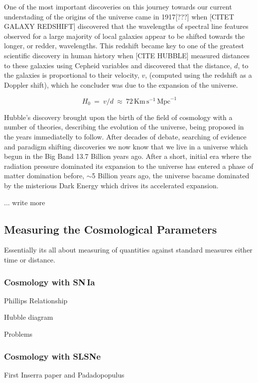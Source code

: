 One of the most important discoveries on this journey towards our current understading of the origins of the universe came in 1917[???] when [CITET GALAXY REDSHIFT] discovered that the wavelengths of spectral line features observed for a large majority of local galaxies appear to be shifted towards the longer, or redder, wavelengths. This redshift became key to one of the greatest scientific discovery in human history when [CITE HUBBLE] measured distances to these galaxies using Cepheid variables and discovered that the distance, $d$, to the galaxies is proportional to their velocity, $v$, (computed using the redshift as a Doppler shift), which he concluder was due to the expansion of the universe.

\begin{equation}
H_0~=~v/d~\approx~72\,\mathrm{Km}\,\mathrm{s}^{-1}\,\mathrm{Mpc}^{-1}
\end{equation}

Hubble's discovery brought upon the birth of the field of cosmology with a number of theories, describing the evolution of the universe, being proposed in the years immediatelly to follow. After decades of debate, searching of evidence and paradigm shifting discoveries we now know that we live in a universe which begun in the Big Band 13.7 Billion years ago. After a short, initial era where the radiation pressure dominated its expansion to the universe has entered a phase of matter domination before, $\sim$5 Billion years ago, the universe bacame dominated by the misterious Dark Energy which drives its accelerated expansion.

... write more

\subsection{Measuring the Cosmological Parameters}
Essentially its all about measuring of quantities against standard measures either time or distance.

\subsubsection{Cosmology with SN\,Ia}
Phillips Relationship

Hubble diagram

Problems

\subsubsection{Cosmology with SLSNe}
First Inserra paper and Padadopopulus

